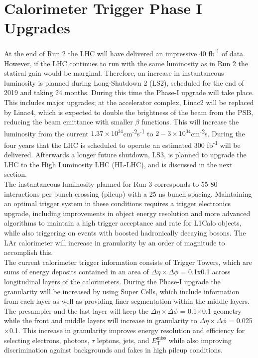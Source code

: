 \section{Calorimeter Trigger Phase I Upgrades}
At the end of Run 2 the LHC will have delivered an impressive 40 fb\textsuperscript{-1} of data.  However, if the LHC continues to run with the same luminosity as in Run 2 the statical gain would be marginal.  Therefore, an increase in instantaneous luminosity is planned during Long-Shutdown 2 (LS2), scheduled for the end of 2019 and taking 24 months.  During this time the Phase-I upgrade will take place.  This includes major upgrades; at the accelerator complex, Linac2 will be replaced by Linac4, which is expected to double the brightness of the beam from the PSB, reducing the beam emittance with smaller $\beta$ functions.  This will increase the luminosity from the current $1.37\times10^{34}$cm\textsuperscript{-2}s\textsuperscript{-1} to $2-3\times10^{34}$cm\textsuperscript{-2}s.  During the four years that the LHC is scheduled to operate an estimated 300 fb\textsuperscript{-1} will be delivered. Afterwards a longer future shutdown, LS3, is planned to upgrade the LHC to the High Luminosity LHC (HL-LHC), and is discussed in the next section. \\

The instantaneous luminosity planned for Run 3 corresponds to 55-80 interactions per bunch crossing (pileup) with a 25 ns bunch spacing.  Maintaining an optimal trigger system in these conditions requires a trigger electronics upgrade, including improvements in object energy resolution and more advanced algorithms to maintain a high trigger acceptance and rate for L1Calo objects, while also triggering on events with boosted hadronically decaying bosons.  The LAr calorimeter will increase in granularity by an order of magnitude to accomplish this. \\

The current calorimeter trigger information consists of Trigger Towers, which are sums of energy deposits contained in an area of $\Delta\eta \times \Delta\phi$ = 0.1x0.1 across longitudinal layers of the calorimeters.  During the Phase-I upgrade the granularity will be increased by using Super Cells, which include information from each layer as well as providing finer segmentation within the middle layers.  The presampler and the last layer will keep the $\Delta\eta \times \Delta\phi$ = 0.1$\times$0.1 geometry while the front and middle layers will increase in granularity to $\Delta\eta \times \Delta\phi$ = 0.025$\times$0.1.  This increase in granularity improves energy resolution and efficiency for selecting electrons, photons, $\tau$ leptons, jets, and $E_{\mathrm{T}}^{\mathrm{miss}}$ while also improving discrimination against backgrounds and fakes in high pileup conditions.  \\

